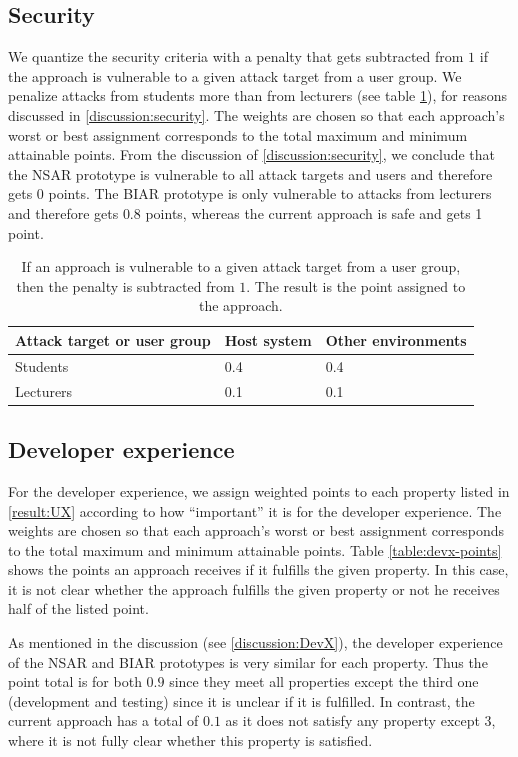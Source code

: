 \subsection{Security}
We quantize the security criteria with a penalty that gets subtracted from $1$ if the approach is vulnerable to a given attack target from a user group. We penalize attacks from students more than from lecturers (see table \ref{table:security-points}), for reasons discussed in \ref{discussion:security}. The weights are chosen so that each approach's worst or best assignment corresponds to the total maximum and minimum attainable points. From the discussion of \ref{discussion:security}, we conclude that the NSAR prototype is vulnerable to all attack targets and users and therefore gets $0$ points. The BIAR prototype is only vulnerable to attacks from lecturers and therefore gets $0.8$ points, whereas the current approach is safe and gets 1 point. 

\begin{table}[h!]
\centering
\begin{tabular}{||m{3cm}|| m{1.2cm} m{2.3cm}||} 
 \hline
 Attack target or user group & Host system & Other \newline environments \\
 \hline\hline
 Students & 0.4 & 0.4 \\ 
 Lecturers & 0.1 & 0.1 \\
 \hline
\end{tabular}
\caption{If an approach is vulnerable to a given attack target from a user group, then the penalty is subtracted from $1$. The result is the point assigned to the approach.}
\label{table:security-points}
\end{table}

\subsection{Developer experience}
For the developer experience, we assign weighted points to each property listed in \ref{result:UX} according to how ``important'' it is for the developer experience. The weights are chosen so that each approach's worst or best assignment corresponds to the total maximum and minimum attainable points.
Table \ref{table:devx-points} shows the points an approach receives if it fulfills the given property. In this case, it is not clear whether the approach fulfills the given property or not he receives half of the listed point. 

As mentioned in the discussion (see \ref{discussion:DevX}), the developer experience of the NSAR and BIAR prototypes is very similar for each property. Thus the point total is for both $0.9$ since they meet all properties except the third one (development and testing) since it is unclear if it is fulfilled. In contrast, the current approach has a total of $0.1$ as it does not satisfy any property except 3, where it is not fully clear whether this property is satisfied. 

